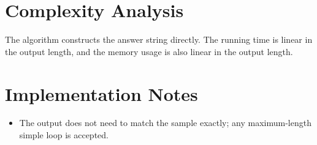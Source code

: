 \documentclass[11pt]{article}
\begin{document}
\section*{Complexity Analysis}

The algorithm constructs the answer string directly. The running time is linear in the output length, and
the memory usage is also linear in the output length.

\section*{Implementation Notes}

\begin{itemize}[leftmargin=*]
    \item The output does not need to match the sample exactly; any maximum-length simple loop is
    accepted.
\end{itemize}
\end{document}
